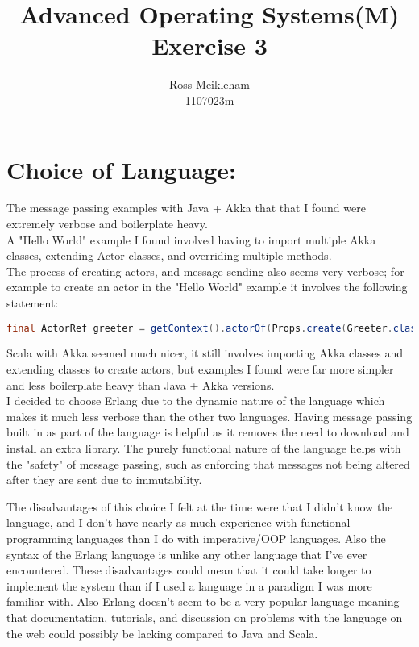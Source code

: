\documentclass[fleqn]{report}
\begin{document}
\title{Advanced Operating Systems(M) Exercise 3}
\author{Ross Meikleham\\ 1107023m}
\maketitle

\section*{Choice of Language:}

The message passing examples with Java + Akka that that I
found were extremely verbose and boilerplate heavy.\\
A "Hello World" example I found involved having to import multiple Akka classes, 
extending Actor classes, and overriding multiple methods. \\
The process of creating actors, and message sending also seems very verbose; for example to create
an actor in the "Hello World" example it involves the following statement:
\vspace{2mm}
\begin{lstlisting}[basicstyle=\ttfamily\scriptsize, language=Java]
final ActorRef greeter = getContext().actorOf(Props.create(Greeter.class), "greeter");
\end{lstlisting}
\vspace{2mm}
Scala with Akka seemed much nicer, it still involves importing Akka classes and 
extending classes to create actors, but examples I found were
far more simpler and less boilerplate heavy than Java + Akka versions.\\

I decided to choose Erlang due to the dynamic nature of the language which makes
it much less verbose than the other two languages. Having message passing built in as 
part of the language is helpful as it removes the need to download and install
an extra library.
The purely functional nature of the language helps with the "safety" of message passing,
such as enforcing that messages not being altered after they are sent due to immutability. 

The disadvantages of this choice I felt at the time were that I didn't know the language, 
and I don't have nearly as much experience with functional programming languages than I do 
with imperative/OOP languages. Also the syntax of the Erlang language is unlike any other 
language that I've ever encountered. These disadvantages could mean that it could
take longer to implement the system than if I used a language in a paradigm 
I was more familiar with. Also Erlang doesn't seem to be a very popular language meaning
that documentation, tutorials, and discussion on problems with the language on the web
could possibly be lacking compared to Java and Scala.
\end{document}
